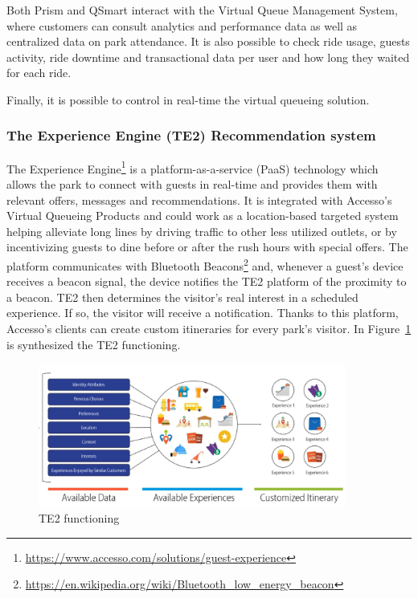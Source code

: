Both Prism and QSmart interact with the Virtual Queue Management System, where customers can consult
analytics and performance data as well as centralized data on park attendance.
It is also possible to check ride usage, guests activity, ride downtime and transactional data per user and how long they waited for each ride.

Finally, it is possible to control in real-time the virtual queueing solution.

\subsubsection{The Experience Engine (TE2) Recommendation system}
The Experience Engine\footnote{\url{https://www.accesso.com/solutions/guest-experience}} is a platform-as-a-service (PaaS) technology
which allows the park to connect with guests in real-time and provides them with relevant offers, messages and recommendations.
It is integrated with Accesso's Virtual Queueing Products and could work as a location-based targeted system~\cite{accesso-location-based-exp} helping alleviate
long lines by driving traffic to other less utilized outlets, or by incentivizing guests to dine before or after the rush
hours with special offers.
The platform communicates with Bluetooth Beacons\footnote{\url{https://en.wikipedia.org/wiki/Bluetooth_low_energy_beacon}} and,
whenever a guest's device receives a beacon signal, the device notifies the TE2 platform of the proximity to a beacon.
TE2 then determines the visitor's real interest in a scheduled experience.
If so, the visitor will receive a notification.
Thanks to this platform, Accesso's clients can create custom itineraries for every park's visitor.
In Figure~\ref{fig:te2ex} is synthesized the TE2 functioning.

\begin{figure}[H]
	\centering
	\includegraphics[width=0.9\textwidth]{img/te2ex}
	\caption{TE2 functioning}
	\label{fig:te2ex}
\end{figure}


